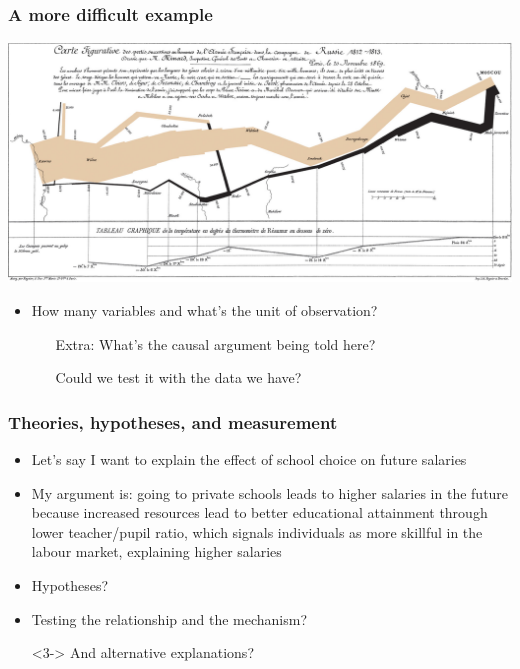 \documentclass[aspectratio=43]{beamer}
\begin{document}
\begin{frame}
\frametitle{A more difficult example}
\centering

\includegraphics[width = \textwidth]{../img/Minard}

\vspace{10pt}

\begin{itemize}\footnotesize
  \item How many variables and what's the unit of observation?
  \begin{itemize}
    \item[Extra:] What's the causal argument being told here?
    \item[] Could we test it with the data we have?
  \end{itemize}
\end{itemize}

\end{frame}

\begin{frame}
\frametitle{Theories, hypotheses, and measurement}
\centering

\begin{itemize}
  \item Let's say I want to explain the effect of school choice on future salaries
  \item My argument is: going to private schools leads to higher salaries in the future because increased resources lead to better educational attainment through lower teacher/pupil ratio, which signals individuals as more skillful in the labour market, explaining higher salaries
  \item[]
  \item<2-> Hypotheses?
  \item<3-> Testing the relationship and the mechanism?
  \item[]<3-> And alternative explanations?
\end{itemize}

\end{frame}
\end{document}
